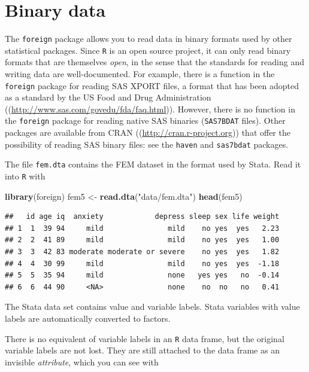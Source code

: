 \documentclass[
]{book}
\newenvironment{Shaded}{\begin{snugshade}}{\end{snugshade}}
\newcommand{\FunctionTok}[1]{\textcolor[rgb]{0.13,0.29,0.53}{\textbf{#1}}}
\newcommand{\NormalTok}[1]{#1}
\newcommand{\OtherTok}[1]{\textcolor[rgb]{0.56,0.35,0.01}{#1}}
\newcommand{\StringTok}[1]{\textcolor[rgb]{0.31,0.60,0.02}{#1}}
\begin{document}
\section{Binary data}\label{binary-data}

The \texttt{foreign} package allows you to read data in binary formats
used by other statistical packages. Since \texttt{R} is an open source
project, it can only read binary formats that are themselves \emph{open},
in the sense that the standards for reading and writing data are
well-documented. For example, there is a function in the
\texttt{foreign} package for reading SAS XPORT files, a format that
has been adopted as a standard by the US Food and Drug Administration
((\url{http://www.sas.com/govedu/fda/faq.html})). However, there is no
function in the \texttt{foreign} package for reading native SAS
binaries (\texttt{SAS7BDAT} files). Other packages are available from
CRAN ((\url{http://cran.r-project.org})) that offer the possibility of
reading SAS binary files: see the \texttt{haven} and \texttt{sas7bdat}
packages.

The file \texttt{fem.dta} contains the FEM dataset in the format
used by Stata. Read it into \texttt{R} with

\begin{Shaded}
\begin{Highlighting}[]
\FunctionTok{library}\NormalTok{(foreign)}
\NormalTok{fem5 }\OtherTok{\textless{}{-}} \FunctionTok{read.dta}\NormalTok{(}\StringTok{"data/fem.dta"}\NormalTok{)}
\FunctionTok{head}\NormalTok{(fem5)}
\end{Highlighting}
\end{Shaded}

\begin{verbatim}
##   id age iq  anxiety            depress sleep sex life weight
## 1  1  39 94     mild               mild    no yes  yes   2.23
## 2  2  41 89     mild               mild    no yes  yes   1.00
## 3  3  42 83 moderate moderate or severe    no yes  yes   1.82
## 4  4  30 99     mild               mild    no yes  yes  -1.18
## 5  5  35 94     mild               none   yes yes   no  -0.14
## 6  6  44 90     <NA>               none    no  no   no   0.41
\end{verbatim}

The Stata data set contains value and variable labels.
Stata variables with value labels are automatically converted to
factors.

There is no equivalent of variable labels in an \texttt{R} data frame,
but the original variable labels are not lost. They are still attached
to the data frame as an invisible \emph{attribute}, which you can see
with
\end{document}
